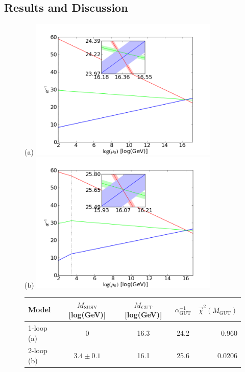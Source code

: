 \documentclass[12pt,a4paper,oneside]{article}
\begin{document}
\subsection{Results and Discussion}

\begin{figure}[p]
\begin{center}
(a) \includegraphics[width=9cm]{figs/mssm-1loop.png} \\
(b) \includegraphics[width=9cm]{figs/mssm-2loop.png} \\
\vspace{2em}
\begin{tabular}{l|c|cc|r}
Model & $M_\mathrm{SUSY}$ [log(GeV)] & $M_\mathrm{GUT}$ [log(GeV)] & $\alpha^{-1}_\mathrm{GUT}$ & $\overrightarrow{\chi}^2 (M_\mathrm{GUT})$ \\
\hline
1-loop (a) & 0 & 16.3 & 24.2 & 0.960 \\
2-loop (b) & $3.4\pm0.1$ & 16.1 & 25.6 & 0.0206 \\
\end{tabular}


\end{center}
\end{figure}
\end{document}
